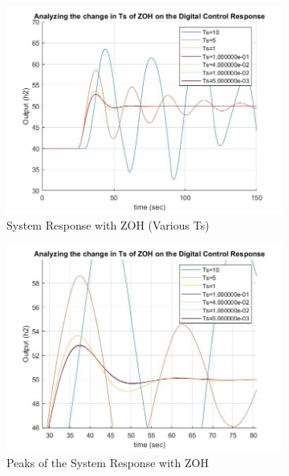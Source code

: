 \documentclass[a4paper,12pt,oneside,onecolumn]{article} %
\begin{document}
\begin{figure}[H]
\centering
\begin{subfigure}{0.4\textwidth}
  \includegraphics[width = \textwidth]{ex_7_2}
\caption{System Response with ZOH (Various Ts)}
\end{subfigure}
\vspace{1em}
\begin{subfigure}{0.4\textwidth}
  \includegraphics[width = \textwidth]{ex_7_4}
\caption{Peaks of the System Response with ZOH}
\end{subfigure}
\vspace{1em}
\begin{subfigure}{0.4\textwidth}

\end{subfigure}
\end{figure}
\end{document}
